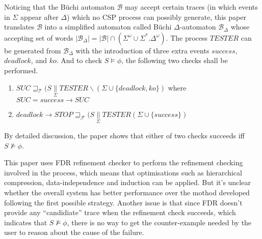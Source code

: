 \documentclass{llncs}
\newcommand{\csppre}[2]{#1 \rightarrow #2}
\newcommand{\csppara}[3]{#1 \underset{#2}{\parallel} #3}
\newcommand{\csptracesmodel}{\mathcal{T}}
\newcommand{\cspfailuresmodel}{\mathcal{F}}
\begin{document}
Noticing that the B\"uchi automaton $\mathcal{B}$ may accept certain traces
(in which events in $\Sigma$ appear after $\Delta$) which no CSP process 
can possibly generate, this paper translates $\mathcal{B}$ into a simplified
automaton called
B\"uchi $\Delta$-automaton $\mathcal{B}_\Delta$ whose accepting set of words
$|\mathcal{B}_\Delta| = |\mathcal{B}| \cap (\Sigma^\omega \cup
\Sigma^*.\Delta^\omega)$. 
The process $TESTER$ can be generated from $\mathcal{B}_\Delta$
with the introduction of three extra events $success$, $deadlock$, and $ko$.
And to check $S \models \phi$, the following two checks shall be performed.
\begin{enumerate}

\item $SUC \sqsupseteq_\csptracesmodel 
  (\csppara{S}{\Sigma}{TESTER}\backslash(\Sigma \cup \{deadlock, ko\})$ 
  where $SUC = \csppre{success}{SUC}$

\item $\csppre{deadlock}{STOP} \sqsupseteq_\cspfailuresmodel 
       (\csppara{S}{\Sigma}{TESTER}(\Sigma \cup \{success\})$ 

\end{enumerate}
By detailed discussion, the paper shows that either of two checks succeeds iff
$S \not\models \phi$.

This paper uses FDR refinement checker to perform the refinement checking
involved in the process, which means that optimisations such as hierarchical
compression, data-independence and induction can be applied. But it's unclear
whether the overall system has better performance over the mothod developed
following the first possible strategy.
Another issue is that since FDR doesn't provide any
``candidiate'' trace when the refinement check succeeds, 
which indicates that $S \not\models \phi$, there is no way to get the
counter-example needed by the user to reason about the cause of the failure.


\newpage
\end{document}
